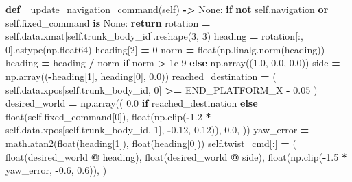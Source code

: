 \documentclass[
  chinese,
  11pt,
  letterpaper,
]{article}
\newenvironment{Shaded}{\begin{snugshade}}{\end{snugshade}}
\newcommand{\BuiltInTok}[1]{#1}
\newcommand{\ControlFlowTok}[1]{\textcolor[rgb]{0.13,0.29,0.53}{\textbf{#1}}}
\newcommand{\DecValTok}[1]{\textcolor[rgb]{0.00,0.00,0.81}{#1}}
\newcommand{\FloatTok}[1]{\textcolor[rgb]{0.00,0.00,0.81}{#1}}
\newcommand{\KeywordTok}[1]{\textcolor[rgb]{0.13,0.29,0.53}{\textbf{#1}}}
\newcommand{\NormalTok}[1]{#1}
\newcommand{\OperatorTok}[1]{\textcolor[rgb]{0.81,0.36,0.00}{\textbf{#1}}}
\newcommand{\VariableTok}[1]{\textcolor[rgb]{0.00,0.00,0.00}{#1}}
\renewenvironment{Shaded}{\par\smallskip}{\par\smallskip}
\begin{document}
\begin{Shaded}
\begin{Highlighting}[]
    \KeywordTok{def}\NormalTok{ \_update\_navigation\_command(}\VariableTok{self}\NormalTok{) }\OperatorTok{{-}\textgreater{}} \VariableTok{None}\NormalTok{:}
        \ControlFlowTok{if} \KeywordTok{not} \VariableTok{self}\NormalTok{.navigation }\KeywordTok{or} \VariableTok{self}\NormalTok{.fixed\_command }\KeywordTok{is} \VariableTok{None}\NormalTok{:}
            \ControlFlowTok{return}
\NormalTok{        rotation }\OperatorTok{=} \VariableTok{self}\NormalTok{.data.xmat[}\VariableTok{self}\NormalTok{.trunk\_body\_id].reshape(}\DecValTok{3}\NormalTok{, }\DecValTok{3}\NormalTok{)}
\NormalTok{        heading }\OperatorTok{=}\NormalTok{ rotation[:, }\DecValTok{0}\NormalTok{].astype(np.float64)}
\NormalTok{        heading[}\DecValTok{2}\NormalTok{] }\OperatorTok{=} \DecValTok{0}
\NormalTok{        norm }\OperatorTok{=} \BuiltInTok{float}\NormalTok{(np.linalg.norm(heading))}
\NormalTok{        heading }\OperatorTok{=}\NormalTok{ heading }\OperatorTok{/}\NormalTok{ norm }\ControlFlowTok{if}\NormalTok{ norm }\OperatorTok{\textgreater{}} \FloatTok{1e{-}9} \ControlFlowTok{else}\NormalTok{ np.array((}\FloatTok{1.0}\NormalTok{, }\FloatTok{0.0}\NormalTok{, }\FloatTok{0.0}\NormalTok{))}
\NormalTok{        side }\OperatorTok{=}\NormalTok{ np.array((}\OperatorTok{{-}}\NormalTok{heading[}\DecValTok{1}\NormalTok{], heading[}\DecValTok{0}\NormalTok{], }\FloatTok{0.0}\NormalTok{))}
\NormalTok{        reached\_destination }\OperatorTok{=}\NormalTok{ (}
            \VariableTok{self}\NormalTok{.data.xpos[}\VariableTok{self}\NormalTok{.trunk\_body\_id, }\DecValTok{0}\NormalTok{] }\OperatorTok{\textgreater{}=}\NormalTok{ END\_PLATFORM\_X }\OperatorTok{{-}} \FloatTok{0.05}
\NormalTok{        )}
\NormalTok{        desired\_world }\OperatorTok{=}\NormalTok{ np.array((}
            \FloatTok{0.0} \ControlFlowTok{if}\NormalTok{ reached\_destination }\ControlFlowTok{else} \BuiltInTok{float}\NormalTok{(}\VariableTok{self}\NormalTok{.fixed\_command[}\DecValTok{0}\NormalTok{]),}
            \BuiltInTok{float}\NormalTok{(np.clip(}\OperatorTok{{-}}\FloatTok{1.2} \OperatorTok{*} \VariableTok{self}\NormalTok{.data.xpos[}\VariableTok{self}\NormalTok{.trunk\_body\_id, }\DecValTok{1}\NormalTok{], }\OperatorTok{{-}}\FloatTok{0.12}\NormalTok{, }\FloatTok{0.12}\NormalTok{)),}
            \FloatTok{0.0}\NormalTok{,}
\NormalTok{        ))}
\NormalTok{        yaw\_error }\OperatorTok{=}\NormalTok{ math.atan2(}\BuiltInTok{float}\NormalTok{(heading[}\DecValTok{1}\NormalTok{]), }\BuiltInTok{float}\NormalTok{(heading[}\DecValTok{0}\NormalTok{]))}
        \VariableTok{self}\NormalTok{.twist\_cmd[:] }\OperatorTok{=}\NormalTok{ (}
            \BuiltInTok{float}\NormalTok{(desired\_world }\OperatorTok{@}\NormalTok{ heading),}
            \BuiltInTok{float}\NormalTok{(desired\_world }\OperatorTok{@}\NormalTok{ side),}
            \BuiltInTok{float}\NormalTok{(np.clip(}\OperatorTok{{-}}\FloatTok{1.5} \OperatorTok{*}\NormalTok{ yaw\_error, }\OperatorTok{{-}}\FloatTok{0.6}\NormalTok{, }\FloatTok{0.6}\NormalTok{)),}
\NormalTok{        )}


\end{Highlighting}
\end{Shaded}
\end{document}
